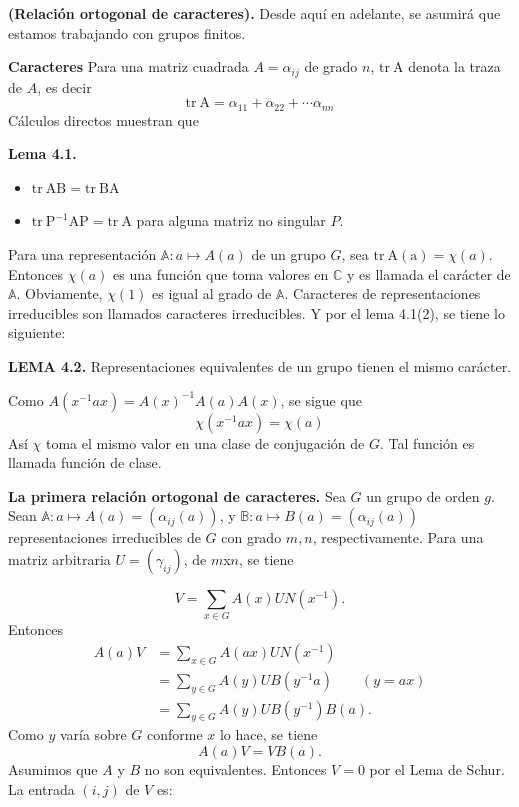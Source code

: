 \documentclass[12pt]{book}
\theoremstyle{definition}
\newcounter{in}
\newcounter{ini}
\begin{document}
\textbf{(Relación ortogonal de caracteres).} Desde aquí en adelante,
se asumirá que estamos trabajando con grupos finitos.

\textbf{Caracteres} Para una matriz cuadrada $A=\alpha_{ij}$ de grado
$n$, $\mathrm{tr\ A}$ denota la traza de $A$, es decir
\begin{equation*}
  \mathrm{tr\ A}=\alpha_{11}+\alpha_{22}+ \cdots \alpha_{nn}
\end{equation*}
Cálculos directos muestran que

\textbf{Lema 4.1. }
\begin{itemize}
\item $\mathrm{tr\ AB}=\mathrm{tr\ BA}$
\item $\mathrm{tr\ P^{-1}AP}=\mathrm{tr\ A}$ para alguna matriz no singular $P$.
\end{itemize}

Para una representación $\mathbb{A} \colon a \mapsto A\left(a\right)$
de un grupo $G$, sea $\mathrm{tr\ A(a)}=\chi(a)$. Entonces $\chi(a)$
es una función que toma valores en $\mathbb{C}$ y es llamada el
carácter de $\mathbb{A}$. Obviamente, $\chi(1)$ es igual al grado de
$\mathbb{A}$. Caracteres de representaciones irreducibles son llamados
caracteres irreducibles. Y por el lema 4.1(2), se tiene lo siguiente:

\textbf{LEMA 4.2. } Representaciones equivalentes de un grupo tienen
el mismo carácter.

Como $A(x^{-1}ax)=A(x)^{-1}A(a)A(x)$, se sigue que
\begin{equation*}
  \chi(x^{-1}ax)=\chi(a)
\end{equation*}  
Así $\chi$ toma el mismo valor en una clase de conjugación de $G$. Tal
función es llamada función de clase.

\textbf{La primera relación ortogonal de caracteres.} Sea $G$ un grupo
de orden $g$. Sean
$\mathbb{A} \colon a \mapsto A\left(a\right) = (\alpha_{ij}(a))$, y
$\mathbb{B} \colon a \mapsto B\left(a\right) = (\alpha_{ij}(a))$
representaciones irreducibles de $G$ con grado $m,n$,
respectivamente. Para una matriz arbitraria $U=(\gamma_{ij})$, de
$m$x$n$, se tiene

\begin{equation*}
 V=\sum_{x \in G} A(x)UN(x^{-1}).
\end{equation*}
Entonces
\begin{equation*}
  \begin{aligned}
    A(a)V &=\sum_{x \in G} A(ax)UN(x^{-1})\\
    &=\sum_{y \in G} A(y)UB(y^{-1}a) \qquad (y=ax)\\
    &=\sum_{y \in G} A(y)UB(y^{-1})B(a).
  \end{aligned}
\end{equation*}
Como $y$ varía sobre $G$ conforme $x$ lo hace, se tiene
\begin{equation*}
  A(a)V=VB(a).
\end{equation*}  
Asumimos que $A$ y $B$ no son equivalentes. Entonces $V=0$ por el Lema
de Schur. La entrada $(i,j)$ de $V$ es:
\end{document}
